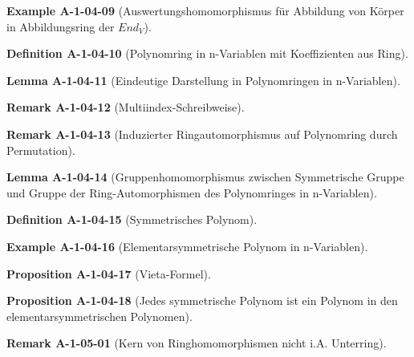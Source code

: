 \documentclass[10pt, letterpaper]{article}
\newcommand{\CustomHeading}[3]{%
  \par\medskip\noindent%
  \textbf{#1 #2} \textnormal{(#3)}.\enskip%
}
\newenvironment{DEF}[2]{\CustomHeading{Definition}{#1}{#2}}{}
\newenvironment{PROP}[2]{\CustomHeading{Proposition}{#1}{#2}}{}
\newenvironment{LEM}[2]{\CustomHeading{Lemma}{#1}{#2}}{}
\newenvironment{REM}[2]{\CustomHeading{Remark}{#1}{#2}}{}
\newenvironment{EXA}[2]{\CustomHeading{Example}{#1}{#2}}{}
\begin{document}
\begin{EXA}{A-1-04-09}{Auswertungshomomorphismus für Abbildung von Körper in Abbildungsring der $End_V$}
\end{EXA}

\begin{DEF}{A-1-04-10}{Polynomring in n-Variablen mit Koeffizienten aus Ring}
\end{DEF}

\begin{LEM}{A-1-04-11}{Eindeutige Darstellung in Polynomringen in n-Variablen}
\end{LEM}

\begin{REM}{A-1-04-12}{Multiindex-Schreibweise}
\end{REM}

\begin{REM}{A-1-04-13}{Induzierter Ringautomorphismus auf Polynomring durch Permutation}
\end{REM}

\begin{LEM}{A-1-04-14}{Gruppenhomomorphismus zwischen Symmetrische Gruppe und Gruppe der Ring-Automorphismen des Polynomringes in n-Variablen}
\end{LEM}

\begin{DEF}{A-1-04-15}{Symmetrisches Polynom}
\end{DEF}

\begin{EXA}{A-1-04-16}{Elementarsymmetrische Polynom in n-Variablen}
\end{EXA}

\begin{PROP}{A-1-04-17}{Vieta-Formel}
\end{PROP}

\begin{PROP}{A-1-04-18}{Jedes symmetrische Polynom ist ein Polynom in den elementarsymmetrischen Polynomen}
\end{PROP}

\begin{REM}{A-1-05-01}{Kern von Ringhomomorphismen nicht i.A. Unterring}
\end{REM}
\end{document}
